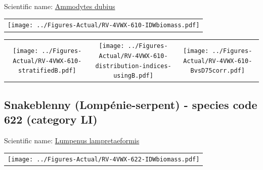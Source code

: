 \documentclass[12pt]{article}\usepackage[]{graphicx}\usepackage[]{color}
\begin{document}
  


Scientific name: \href{http://www.marinespecies.org/aphia.php?p=taxdetails\&id=151520}{Ammodytes dubius} \newline
\begin{minipage}{1.0\textwidth}
 \begin{tabular}{c}
\texttt{[image: ../Figures-Actual/RV-4VWX-610-IDWbiomass.pdf]} \\ 
\end{tabular} 
\end{minipage}
\newline

\vspace{1cm}
\begin{minipage}{1.0\textwidth}
 \begin{tabular}{ccc}
\texttt{[image: ../Figures-Actual/RV-4VWX-610-stratifiedB.pdf]} & 
\texttt{[image: ../Figures-Actual/RV-4VWX-610-distribution-indices-usingB.pdf]} & 
\texttt{[image: ../Figures-Actual/RV-4VWX-610-BvsD75corr.pdf]} \\ 
\end{tabular} 
\end{minipage}
\clearpage

\renewcommand\thefigure{\thesubsection\Alph{figure}}

\setcounter{figure}{0}

\hypertarget{sec:622}{%
\subsection{Snakeblenny (Lompénie-serpent) - species code 622 (category LI)}\label{sec:622}}

  


Scientific name: \href{http://www.marinespecies.org/aphia.php?p=taxdetails\&id=154675}{Lumpenus lampretaeformis} \newline
\begin{minipage}{1.0\textwidth}
 \begin{tabular}{c}
\texttt{[image: ../Figures-Actual/RV-4VWX-622-IDWbiomass.pdf]} \\ 
\end{tabular} 
\end{minipage}
\newline
\end{document}
